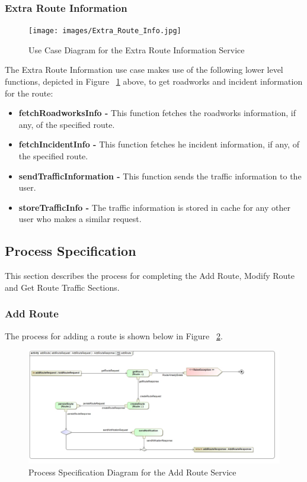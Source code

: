 \documentclass[a4paper,12pt]{article}
\begin{document}
\subsubsection{Extra Route Information}
\begin{figure}[here]
\texttt{[image: images/Extra\_Route\_Info.jpg]}
\caption{Use Case Diagram for the Extra Route Information Service}
\label{fig:uc_extra}
\end{figure}

The Extra Route Information use case makes use of the following lower level functions, depicted in Figure ~\ref{fig:uc_extra} above, to get roadworks and incident information for the route:

\begin{itemize}
\item \textbf{fetchRoadworksInfo -} This function fetches the roadworks information, if any, of the specified route.
\item \textbf{fetchIncidentInfo -} This function fetches he incident information, if any, of the specified route.
\item \textbf{sendTrafficInformation -} This function sends the traffic information to the user.
\item \textbf{storeTrafficInfo -} The traffic information is stored in cache for any other user who makes a similar request.
\end{itemize}

\subsection{Process Specification}
This section describes the process for completing the Add Route, Modify Route and Get Route Traffic Sections.
\subsubsection{Add Route}
The process for adding a route is shown below in Figure ~\ref{fig:ps_add}.
\begin{figure}[here]
\includegraphics[width=\textwidth]{images/psAdd_Route.jpg}
\caption{Process Specification Diagram for the Add Route Service}
\label{fig:ps_add}
\end{figure}
\end{document}
